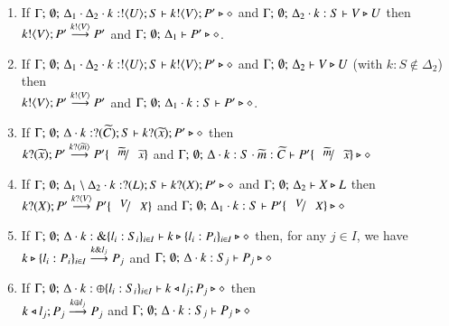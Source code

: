 \begin{lemma}
\begin{enumerate}[1.]
\item If $\Gamma;\, \emptyset;\, \Delta_1 \cdot \Delta_2 \cdot k:! \langle U \rangle ; S \vdash k ! \langle V \rangle ; P' \triangleright \diamond$
and $\Gamma;\, \emptyset;\, \Delta_2 \cdot k:S \vdash V \triangleright U$ then \\
$k ! \langle V \rangle ; P' \stackrel{k ! \langle V \rangle}{\longrightarrow} P'$
and $\Gamma;\, \emptyset;\, \Delta_1 \vdash P' \triangleright \diamond$.

\item If $\Gamma;\, \emptyset;\, \Delta_1 \cdot \Delta_2 \cdot k:! \langle U \rangle ; S \vdash k ! \langle V \rangle ; P' \triangleright \diamond$
and $\Gamma;\, \emptyset;\, \Delta_2 \vdash V \triangleright U$ (with $k:S \not\in \Delta_2$) then \\
$k ! \langle V \rangle ; P' \stackrel{k ! \langle V \rangle}{\longrightarrow} P'$
and $\Gamma;\, \emptyset;\, \Delta_1 \cdot k:S \vdash P' \triangleright \diamond$.

\item If $\Gamma;\, \emptyset;\, \Delta \cdot k:? (\widetilde{C}) ; S \vdash k ? (\widetilde{x}) ; P' \triangleright \diamond$
 then \\
$\binp{k}{\mytilde{x}}P' \by{\bactinp{k}{\mytilde{m}}} P'\subst{\mytilde{m}}{\mytilde{x}}$
and $\Gamma;\, \emptyset;\, \Delta \cat k:S \cat \mytilde{m}:\mytilde{C} \proves P'\subst{\mytilde{m}}{\mytilde{x}} \hastype \Proc$


\item If $\Gamma;\, \emptyset;\, \Delta_1 \setminus \Delta_2 \cdot k:? (L) ; S \vdash k ? (X) ; P' \triangleright \diamond$
and
$\Gamma;\, \emptyset;\, \Delta_2   \vdash X \triangleright L$
 then \\
$\binp{k}{X}P' \by{\bactinp{k}{V}} P'\subst{V}{X}$
and $\Gamma;\, \emptyset;\, \Delta_1 \cat k:S \proves P'\subst{V}{X} \hastype \Proc$

\item If $\Gamma;\, \emptyset;\, \Delta \cdot k:\& \{l_i:S_i\}_{i \in I} \vdash k \triangleright \{l_i : P_i\}_{i \in I}  \triangleright \diamond$
 then, for any $j \in I$, we have \\
$k \triangleright \{l_i : P_i\}_{i \in I} \stackrel{k \& l_j}{\longrightarrow} P_j $
and $\Gamma;\, \emptyset;\, \Delta \cdot k:S_j   \vdash P_j \triangleright \diamond$

\item If $\Gamma;\, \emptyset;\, \Delta \cdot k:\oplus \{l_i:S_i\}_{i \in I} \vdash k \triangleleft l_j ; P_j  \triangleright \diamond$
 then \\
$k \triangleleft l_j ; P_j \stackrel{k \oplus l_j}{\longrightarrow} P_j $
and $\Gamma;\, \emptyset;\, \Delta \cdot k:S_j   \vdash P_j \triangleright \diamond$


\end{enumerate}
\end{lemma}
